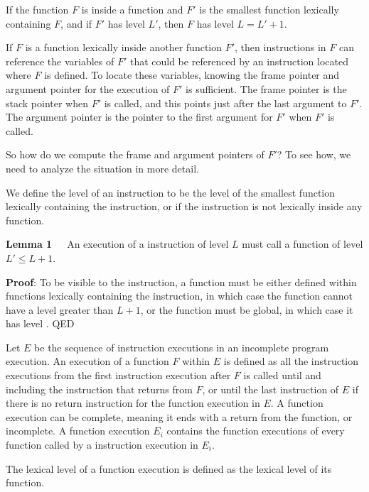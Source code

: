 \documentclass[12pt]{article}
\begin{document}
If the function $F$ is inside a function and $F'$ is the smallest
function lexically containing $F$, and if $F'$ has level $L'$, then $F$
has level $L=L'+1$.

If $F$ is a function lexically inside another function $F'$, then instructions
in $F$ can reference the variables of $F'$ that could be referenced by
an instruction located where $F$ is defined.
To locate these variables, knowing the frame pointer and argument
pointer for the
execution of $F'$ is sufficient.  The frame pointer is the
stack pointer when $F'$ is called, and this points just after the last
argument to $F'$.  The argument pointer is
the pointer to the first argument for $F'$ when $F'$ is called.

So how do we compute the frame and argument pointers of $F'$?  To see how,
we need to analyze the situation in more detail.

We define the level of an instruction to be the level of the
smallest function lexically containing the instruction, or  if the
instruction is not lexically inside any function.

\begin{indpar}
{\bf Lemma 1}\label{LEMMA-1}~~~An execution of a  instruction of
level $L$ must call a function of level $L'\leq L+1$.
\end{indpar}
\begin{indpar}
{\bf Proof}: To be visible to the 
instruction, a function must be either defined within functions
lexically containing the  instruction, in which case the
function cannot have a level greater than $L+1$, or the function must be global,
in which case it has level .  QED
\end{indpar}

Let $E$ be the sequence of instruction executions in an
incomplete program execution.
An execution of a function $F$ within $E$ is defined as all the
instruction executions from the first instruction execution
after $F$ is called until and including the instruction that returns
from $F$, or until the last instruction of $E$ if there is no return
instruction for the function execution in $E$.
A function execution can be complete, meaning
it ends with a return from the function, or incomplete.  A function execution
$E_i$ contains the function executions of every function called by
a  instruction execution in $E_i$.

The lexical level of a function execution is defined as the lexical level
of its function.
\end{document}
